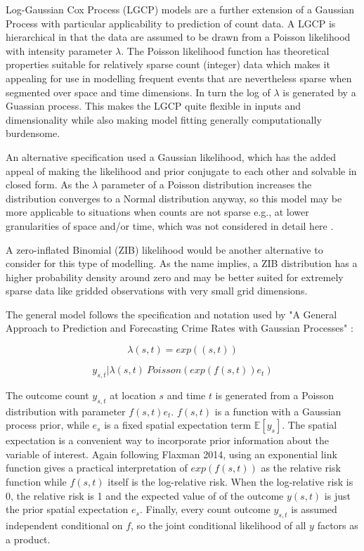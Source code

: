 Log-Gaussian Cox Process (LGCP) models are a further extension of a Gaussian Process with particular applicability to prediction of count data. A LGCP is hierarchical in that the data are assumed to be drawn from a Poisson likelihood with intensity parameter $\lambda$. The Poisson likelihood function has theoretical properties suitable for relatively sparse count (integer) data which makes it appealing for use in modelling frequent events that are nevertheless sparse when segmented over space and time dimensions. In turn the log of $\lambda$  is generated by a Guassian process\cite{teng_2017}. This makes the LGCP quite flexible in inputs and dimensionality while also making model fitting generally computationally burdensome. \par

An alternative specification used a Gaussian likelihood, which has the added appeal of making the likelihood and prior conjugate to each other and solvable in closed form. As the $\lambda$ parameter of a Poisson distribution increases the distribution converges to a Normal distribution anyway, so this model may be more applicable to situations when counts are not sparse e.g., at lower granularities of space and/or time, which was not considered in detail here .

A zero-inflated Binomial (ZIB) likelihood would be another alternative to consider for this type of modelling. As the name implies, a ZIB distribution has a higher probability density around zero and may be better suited for extremely sparse data like gridded observations with very small grid dimensions.

 The general model follows the specification and notation used by "A General Approach to Prediction and Forecasting Crime Rates with Gaussian Processes" \cite{flaxman_2014}: \par


$$\lambda(s,t) = exp((s,t))$$

$$ y_{s,t} | \lambda(s,t) ~ Poisson(exp(f(s,t))e_t) $$

The outcome count $y_{s,t}$ at location $s$ and time $t$ is generated from a Poisson distribution with parameter $f(s,t)e_t$. $f(s,t)$ is a function with a Gaussian process prior, while $e_s$ is a fixed spatial expectation term $\mathbb{E}[y_s]$. The spatial expectation is a convenient way to incorporate prior information about the variable of interest. Again following Flaxman 2014, using an exponential link function gives a practical interpretation of $exp(f(s,t))$ as the relative risk function while $f(s,t)$ itself is the log-relative risk. When the log-relative risk is 0, the relative risk is 1 and the expected value of of the outcome $y(s,t)$ is just the prior spatial expectation $e_s$. Finally, every count outcome $y_{s,t}$ is assumed independent conditional on $f$, so the joint conditional likelihood of all $y$ factors as a product.

